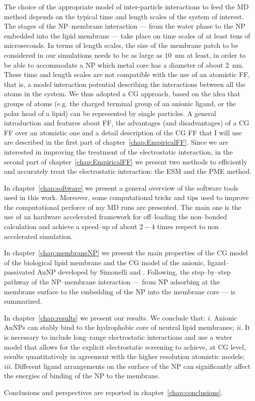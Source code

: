 The choice of the appropriate model of inter-particle interactions to feed the \ac{MD} method depends on the typical time and length scales of the system of interest. The stages of the \ac{NP}--membrane interaction --- from the water phase to the \ac{NP} embedded into the lipid membrane  --- take place on time scales of at least tens of microseconds. In terms of length scales, the size of the membrane patch to be considered in our simulations needs to be as large as $10$~nm at least, in order to be able to accommodate a \ac{NP} which metal core has a diameter of about $2$~nm. These time and length scales are not compatible with the use of an atomistic \ac{FF}, that is, a model interaction potential describing the interactions between all the atoms in the system. We thus adopted a \ac{CG} approach, based on the idea that groups of atoms (e.g. the charged terminal group of an anionic ligand, or the polar head of a lipid) can be represented by single particles. A general introduction and features about \ac{FF}, the advantages (and disadvantages) of a \ac{CG} \ac{FF} over an atomistic one and a detail description of the \ac{CG} \ac{FF} that I will use are described in the first part of chapter~\ref{chap:EmpiricalFF}. Since we are interested in improving the treatment of the electrostatic interaction, in the second part of chapter~\ref{chap:EmpiricalFF} we present two methods to efficiently and accurately treat the electrostatic interaction: the \ac{ESM} and the \ac{PME} method.

In chapter~\ref{chap:software} we present a general overview of the software tools used in this work. Moreover, some computational tricks and tips used to improve the computational perforce of my \ac{MD} runs are presented. The main one is the use of an hardware accelerated framework for off--loading the non--bonded calculation and achieve a speed--up of about $2-4$ times respect to non accelerated simulation.

In chapter~\ref{chap:membraneNP} we present the main properties of the \ac{CG} model of the biological lipid membrane and the \ac{CG} model of the anionic, ligand--passivated \ac{AuNP} developed by Simonelli \etal{} \cite{simonelliThesis} and \cite{ourPaper}. Following, the step--by--step pathway of the \ac{NP}--membrane interaction --- from \ac{NP} adsorbing at the membrane surface to the embedding of the \ac{NP} into the membrane core --- is summarized.

In chapter~\ref{chap:results} we present our results. We conclude that: \textit{i.} Anionic \acp{AuNP} can stably bind to the hydrophobic core of neutral lipid membranes; \textit{ii.} It is necessary to include long--range electrostatic interactions and use a water model that allows for the explicit electrostatic screening to achieve, at \ac{CG} level, results quantitatively in agreement with the higher resolution atomistic models; \textit{iii.} Different ligand arrangements on the surface of the \ac{NP} can significantly affect the energies of binding of the \ac{NP} to the membrane.

Conclusions and perspectives are reported in chapter~\ref{chap:conclusions}.

\restoretoc
\endgroup